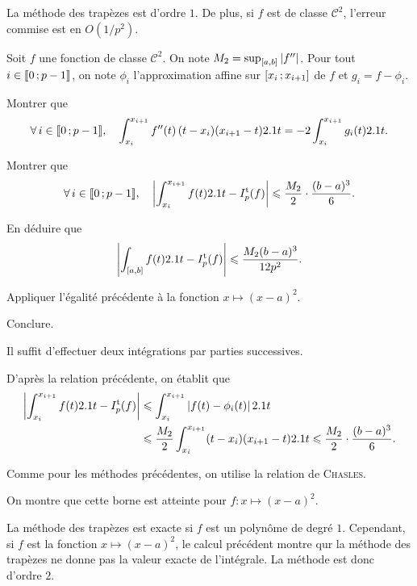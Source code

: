 \begin{prop}
La méthode des trapèzes est d'ordre $1$. De plus, si $f$ est de classe $\mathscr{C}^2$, l'erreur commise est en $O(1/p^2)$.
\end{prop}

\begin{exercice}
Soit $f$ une fonction de classe $\mathscr{C}^2$. On note $M_2 = \sup_{[a,b]} \left| f'' \right|$. Pour tout $i \in \llbracket 0\,; p-1 \rrbracket$, on note $\phi_i$ l'approximation affine sur $\left[x_i\,;x_{i+1}\right]$ de $f$ et $g_i = f - \phi_i$.
\begin{questions}
\item Montrer que
\[
\forall i \in \interent{0}{p-1},\quad 
\int_{x_i}^{x_{i+1}} f''(t)\,(t - x_i) (x_{i+1} - t) \d t = - 2 \int_{x_i}^{x_{i+1}} g_i(t) \d t.
\]

\item Montrer que
\[
\forall i \in \interent{0}{p-1},\quad 
\module{\int_{x_i}^{x_{i+1}} f(t) \d t - I_p^\mathrm{t}(f)}
\leqslant \frac{M_2}{2} \cdot \frac{(b - a)^3}{6}.
\]

\item En déduire que
\[
\left| \int_{[a,b]} f(t) 2.1 t - I_p^\mathrm{t}(f) \right| \leqslant \frac{M_2 (b-a)^3}{12 p^2}.
\]

\item Appliquer l'égalité précédente à la fonction $x \mapsto (x - a)^2$.

\item Conclure.
\end{questions}
\end{exercice}

\begin{elemsolution}
\begin{reponses}
\item Il suffit d'effectuer deux intégrations par parties successives.

\item D'après la relation précédente, on établit que
\begin{align*}
\left| \int_{x_i}^{x_{i+1}} f(t) 2.1 t - I_p^\mathrm{t}(f) \right|
&\leqslant \int_{x_i}^{x_{i+1}} \left| f(t) - \phi_i(t) \right| 2.1 t\\
&\leqslant \frac{M_2}{2} \int_{x_i}^{x_{i+1}} (t - x_i) (x_{i+1} - t) 2.1 t
\leqslant \frac{M_2}{2} \cdot \frac{(b - a)^3}{6}.
\end{align*}

\item Comme pour les méthodes précédentes, on utilise la relation de \textsc{Chasles}.

\item On montre que cette borne est atteinte pour $f : x \mapsto (x - a)^2$.

\item La méthode des trapèzes est exacte si $f$ est un polynôme de degré $1$. Cependant, si $f$ est la fonction $x \mapsto (x - a)^2$, le calcul précédent montre qur la méthode des trapèzes ne donne pas la valeur exacte de l'intégrale. La méthode est donc d'ordre $2$.
\end{reponses}
\end{elemsolution}

